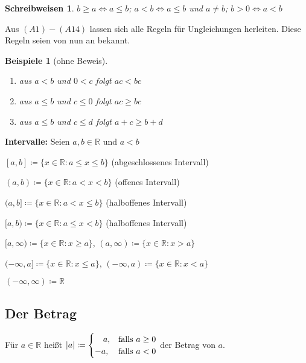 \documentclass[14pt,titlepage,ngerman,a4paper,headsepline,DIV15,halfparskip*]{scrartcl}
\newcommand{\R}{\mathbb{R}}
\theoremstyle{named}
\theoremstyle{dotless}
\newtheorem*{beispiele}{Beispiele}
\newtheorem*{schreibweisen}{Schreibweisen}
\begin{document}
\begin{schreibweisen}
$b \geq a \iff a \leq b$; $a < b \iff a \leq b$ und $a \neq b$; $b > 0 \iff a < b$
\end{schreibweisen}

Aus \hyperref[k.axiom]{$(A1) - (A14)$} lassen sich alle Regeln für Ungleichungen herleiten. Diese Regeln seien von nun an bekannt.


\begin{beispiele}[ohne Beweis] ~\
	\begin{enumerate}
		\item aus $a < b$ und $0 < c$ folgt $ac < bc$
		\item aus $a \leq b$ und $c \leq 0$ folgt $ac \geq bc$
		\item aus $a \leq b$ und $c \leq d$ folgt $a + c \geq b + d$
	\end{enumerate}
\end{beispiele}

\textbf{Intervalle:} Seien  $a, b \in \R$ und $a < b$
\begin{description} \addtolength{\itemindent}{0.4cm}
	\item $[a, b] \coloneqq \{ x \in \R : a \leq x \leq b \}$ (abgeschlossenes Intervall) 
	\item $(a, b) \coloneqq \{ x \in \R : a < x < b \}$ (offenes Intervall)
	\item $(a, b] \coloneqq \{ x \in \R : a < x \leq b \}$ (halboffenes Intervall)
	\item $[a, b) \coloneqq \{ x \in \R : a \leq x < b \}$ (halboffenes Intervall)
	\item $[a, \infty) \coloneqq \{ x \in \R : x \geq a \}$, $(a , \infty) \coloneqq \{ x \in \R : x > a \}$
	\item $(-\infty, a] \coloneqq \{ x \in \R : x \leq a\}$, $(-\infty, a) \coloneqq \{ x \in \R : x < a\}$ 
	\item $(- \infty, \infty) \coloneqq \R$
\end{description}

\subsection*{Der Betrag} 
Für $a \in \R$ hei{\ss}t $|a| \coloneqq \begin{cases} \hspace{0.35cm} a, & \text{falls } a \geq 0 \\ -a, & \text{falls } a < 0\end{cases}$ der Betrag von $a$.
\end{document}
